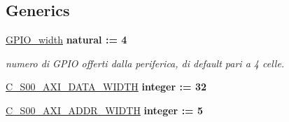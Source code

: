 \subsection*{Generics}
 \begin{DoxyCompactItemize}
\item 
\hypertarget{classmy_g_p_i_o_ga0b52ca75e9a6093b2b60d5e851803069}{\hyperlink{group___a_x_i-device_ga0b52ca75e9a6093b2b60d5e851803069}{G\+P\+I\+O\+\_\+width} {\bfseries {\bfseries \textcolor{vhdlchar}{natural}\textcolor{vhdlchar}{ }\textcolor{vhdlchar}{ }\textcolor{vhdlchar}{\+:}\textcolor{vhdlchar}{=}\textcolor{vhdlchar}{ }\textcolor{vhdlchar}{ } \textcolor{vhdldigit}{4} \textcolor{vhdlchar}{ }}}}\label{classmy_g_p_i_o_ga0b52ca75e9a6093b2b60d5e851803069}

\begin{DoxyCompactList}\small\item\em numero di G\+P\+I\+O offerti dalla periferica, di default pari a 4 celle. \end{DoxyCompactList}\item 
\hypertarget{classmy_g_p_i_o_gafce7943994a4ddfa81f224225976a4c7}{\hyperlink{group___a_x_i-device_gafce7943994a4ddfa81f224225976a4c7}{C\+\_\+\+S00\+\_\+\+A\+X\+I\+\_\+\+D\+A\+T\+A\+\_\+\+W\+I\+D\+T\+H} {\bfseries {\bfseries \textcolor{vhdlchar}{integer}\textcolor{vhdlchar}{ }\textcolor{vhdlchar}{ }\textcolor{vhdlchar}{\+:}\textcolor{vhdlchar}{=}\textcolor{vhdlchar}{ }\textcolor{vhdlchar}{ } \textcolor{vhdldigit}{32} \textcolor{vhdlchar}{ }}}}\label{classmy_g_p_i_o_gafce7943994a4ddfa81f224225976a4c7}

\begin{DoxyCompactList}\small\item\em \end{DoxyCompactList}\item 
\hypertarget{classmy_g_p_i_o_gab7787f274c76bb896ac98fdcfb570c65}{\hyperlink{group___a_x_i-device_gab7787f274c76bb896ac98fdcfb570c65}{C\+\_\+\+S00\+\_\+\+A\+X\+I\+\_\+\+A\+D\+D\+R\+\_\+\+W\+I\+D\+T\+H} {\bfseries {\bfseries \textcolor{vhdlchar}{integer}\textcolor{vhdlchar}{ }\textcolor{vhdlchar}{ }\textcolor{vhdlchar}{\+:}\textcolor{vhdlchar}{=}\textcolor{vhdlchar}{ }\textcolor{vhdlchar}{ } \textcolor{vhdldigit}{5} \textcolor{vhdlchar}{ }}}}\label{classmy_g_p_i_o_gab7787f274c76bb896ac98fdcfb570c65}

\begin{DoxyCompactList}\small\item\em \end{DoxyCompactList}\end{DoxyCompactItemize}
